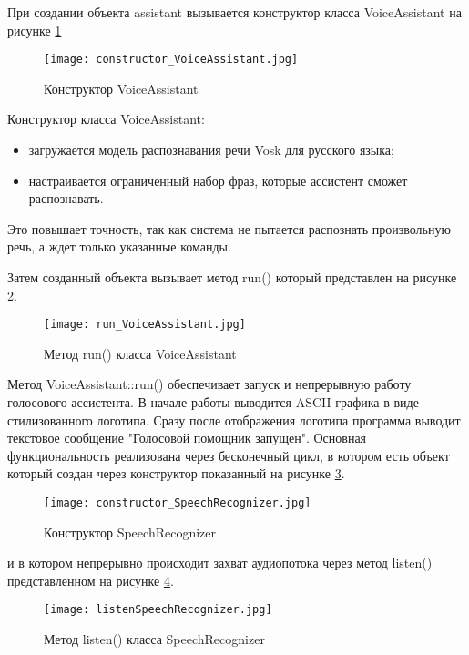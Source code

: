 При создании объекта assistant вызывается конструктор класса VoiceAssistant на рисунке \ref{fig:constructor_VoiceAssistant}

\begin{figure}[H]
	\centering
	\texttt{[image: constructor\_VoiceAssistant.jpg]}
	\caption{Конструктор VoiceAssistant}
	\label{fig:constructor_VoiceAssistant}
\end{figure}

Конструктор класса VoiceAssistant:
\begin{itemize}
 	\item загружается модель распознавания речи Vosk для русского языка;
	\item настраивается ограниченный набор фраз, которые ассистент сможет распознавать.
\end{itemize}

Это повышает точность, так как система не пытается распознать произвольную речь, а ждет только указанные команды.

Затем созданный объекта вызывает метод run() который представлен на рисунке \ref{fig:run_VoiceAssistant}.

\begin{figure}[H]
	\centering
	\texttt{[image: run\_VoiceAssistant.jpg]}
	\caption{Метод run() класса VoiceAssistant}
	\label{fig:run_VoiceAssistant}
\end{figure}

Метод VoiceAssistant::run() обеспечивает запуск и непрерывную работу голосового ассистента. В начале работы выводится ASCII-графика в виде стилизованного логотипа. Сразу после отображения логотипа программа выводит текстовое сообщение "Голосовой помощник запущен". Основная функциональность реализована через бесконечный цикл, в котором есть объект который создан через конструктор показанный на рисунке \ref{fig:constructor_SpeechRecognizer}.

\begin{figure}[H]
	\centering
	\texttt{[image: constructor\_SpeechRecognizer.jpg]}
	\caption{Конструктор SpeechRecognizer}
		\label{fig:constructor_SpeechRecognizer}
\end{figure}
и в котором непрерывно происходит захват аудиопотока через метод listen() представленном на рисунке \ref{fig:listenSpeechRecognizer}.

\begin{figure}[H]
	\centering
	\texttt{[image: listenSpeechRecognizer.jpg]}
	\caption{Метод listen() класса SpeechRecognizer}
	\label{fig:listenSpeechRecognizer}
\end{figure}

